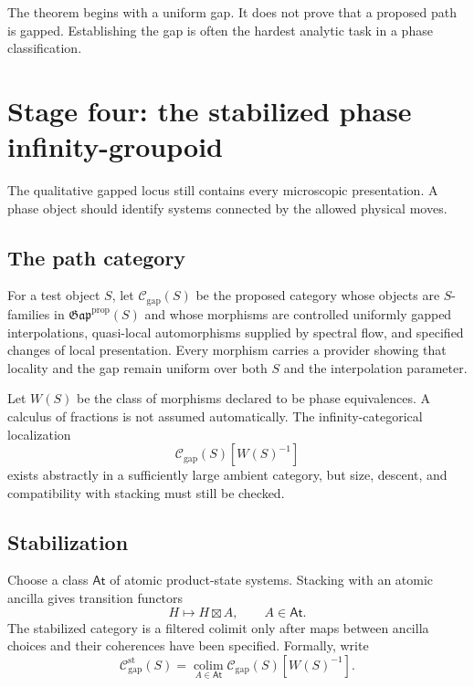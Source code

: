 \documentclass[12pt]{article}
\theoremstyle{definition}
\theoremstyle{remark}
\newcommand{\C}{\mathcal C}
\newcommand{\Gap}{\mathfrak{Gap}}
\begin{document}
The theorem begins with a uniform gap.  It does not prove that a proposed
path is gapped.  Establishing the gap is often the hardest analytic task in
a phase classification.

\section{Stage four: the stabilized phase infinity-groupoid}

The qualitative gapped locus still contains every microscopic
presentation.  A phase object should identify systems connected by the
allowed physical moves.

\subsection{The path category}

For a test object $S$, let $\C_{\mathrm{gap}}(S)$ be the proposed category
whose objects are $S$-families in $\Gap^{\mathrm{prop}}(S)$ and whose
morphisms are controlled uniformly gapped interpolations, quasi-local
automorphisms supplied by spectral flow, and specified changes of local
presentation.  Every morphism carries a provider showing that locality and
the gap remain uniform over both $S$ and the interpolation parameter.

Let $W(S)$ be the class of morphisms declared to be phase equivalences.  A
calculus of fractions is not assumed automatically.  The infinity-categorical
localization
\begin{equation}
\C_{\mathrm{gap}}(S)[W(S)^{-1}]
\label{eq:phase-localization}
\end{equation}
exists abstractly in a sufficiently large ambient category, but size,
descent, and compatibility with stacking must still be checked.

\subsection{Stabilization}

Choose a class $\mathsf{At}$ of atomic product-state systems.  Stacking with
an atomic ancilla gives transition functors
\begin{equation}
H\longmapsto H\boxtimes A,
\qquad A\in\mathsf{At}.
\end{equation}
The stabilized category is a filtered colimit only after maps between ancilla
choices and their coherences have been specified.  Formally, write
\begin{equation}
\C_{\mathrm{gap}}^{\mathrm{st}}(S)
=
\operatorname*{colim}_{A\in\mathsf{At}}
\C_{\mathrm{gap}}(S)[W(S)^{-1}].
\label{eq:stabilized-category}
\end{equation}
\end{document}
